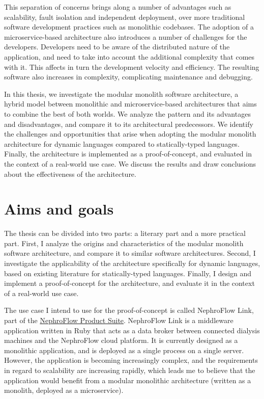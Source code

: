 \documentclass[12pt]{article}
\begin{document}
	This separation of concerns brings along a number of advantages such as scalability, fault isolation and independent deployment, over more traditional software development practices such as monolithic codebases.
	The adoption of a microservice-based architecture also introduces a number of challenges for the developers.
	Developers need to be aware of the distributed nature of the application, and need to take into account the additional complexity that comes with it.
	This affects in turn the development velocity and efficiency.
	The resulting software also increases in complexity, complicating maintenance and debugging.

	In this thesis, we investigate the modular monolith software architecture, a hybrid model between monolithic and microservice-based architectures that aims to combine the best of both worlds.
	We analyze the pattern and its advantages and disadvantages, and compare it to its architectural predecessors.
	We identify the challenges and opportunities that arise when adopting the modular monolith architecture for dynamic languages compared to statically-typed languages.
	Finally, the architecture is implemented as a proof-of-concept, and evaluated in the context of a real-world use case.
	We discuss the results and draw conclusions about the effectiveness of the architecture.

	\clearpage

	\section*{Aims and goals}\label{sec:aims-and-goals}

	The thesis can be divided into two parts: a literary part and a more practical part.
	First, I analyze the origins and characteristics of the modular monolith software architecture, and compare it to similar software architectures.
	Second, I investigate the applicability of the architecture specifically for dynamic languages, based on existing literature for statically-typed languages.
	Finally, I design and implement a proof-of-concept for the architecture, and evaluate it in the context of a real-world use case.

	The use case I intend to use for the proof-of-concept is called NephroFlow Link, part of the \href{https://www.nipro-group.com/en/our-offer/products-services/nephroflowtm-product-suite}{NephroFlow Product Suite}.
	NephroFlow Link is a middleware application written in Ruby that acts as a data broker between connected dialysis machines and the NephroFlow cloud platform.
	It is currently designed as a monolithic application, and is deployed as a single process on a single server.
	However, the application is becoming increasingly complex, and the requirements in regard to scalability are increasing rapidly, which leads me to believe that the application would benefit from a modular monolithic architecture (written as a monolith, deployed as a microservice).
\end{document}
